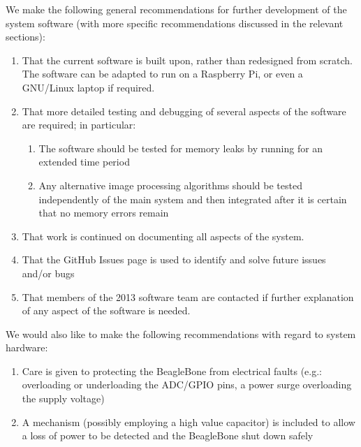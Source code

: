 We make the following general recommendations for further development of the system software (with more specific recommendations discussed in the relevant sections):
\begin{enumerate}
	\item That the current software is built upon, rather than redesigned from scratch. The software can be adapted to run on a Raspberry Pi, or even a GNU/Linux laptop if required.
	\item That more detailed testing and debugging of several aspects of the software are required; in particular:
	\begin{enumerate}
		\item The software should be tested for memory leaks by running for an extended time period
		\item Any alternative image processing algorithms should be tested independently of the main system and then integrated after it is certain that no memory errors remain
	\end{enumerate}
	\item That work is continued on documenting all aspects of the system.
	\item That the GitHub Issues page\cite{GitHub_issues} is used to identify and solve future issues and/or bugs
	\item That members of the 2013 software team are contacted if further explanation of any aspect of the software is needed.
\end{enumerate}

We would also like to make the following recommendations with regard to system hardware:
\begin{enumerate}
	\item Care is given to protecting the BeagleBone from electrical faults (e.g.: overloading or underloading the ADC/GPIO pins, a power surge overloading the supply voltage)
	\item A mechanism (possibly employing a high value capacitor) is included to allow a loss of power to be detected and the BeagleBone shut down safely
\end{enumerate}



